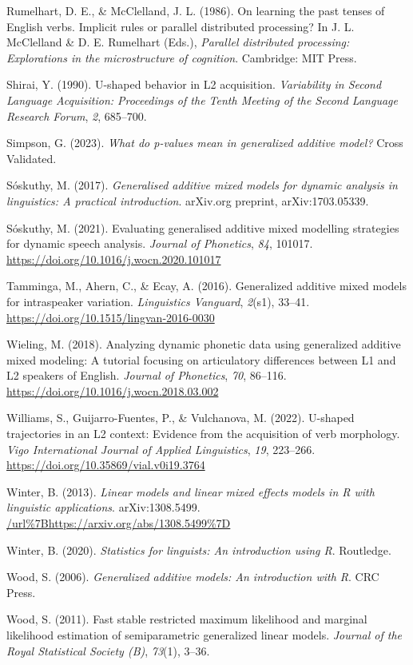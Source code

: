 \documentclass[
  letterpaper,
  DIV=11,
  numbers=noendperiod]{scrartcl}
\newlength{\cslhangindent}
\newenvironment{CSLReferences}[2] %
 {\begin{list}{}{%
  \setlength{\itemindent}{0pt}
  \setlength{\leftmargin}{0pt}
  \setlength{\parsep}{0pt}
  \ifodd #1
   \setlength{\leftmargin}{\cslhangindent}
   \setlength{\itemindent}{-1\cslhangindent}
  \fi
  \setlength{\itemsep}{#2\baselineskip}}}
 {\end{list}}
\begin{document}
\begin{CSLReferences}{1}{0}
Rumelhart, D. E., \& McClelland, J. L. (1986). On learning the past
tenses of {E}nglish verbs. Implicit rules or parallel distributed
processing? In J. L. McClelland \& D. E. Rumelhart (Eds.),
\emph{Parallel distributed processing: Explorations in the
microstructure of cognition}. Cambridge: MIT Press.

Shirai, Y. (1990). {U}-shaped behavior in {L2} acquisition.
\emph{Variability in Second Language Acquisition: Proceedings of the
Tenth Meeting of the {Second Language Research Forum}}, \emph{2},
685--700.

Simpson, G. (2023). \emph{What do p-values mean in generalized additive
model?} Cross Validated.

Sóskuthy, M. (2017). \emph{Generalised additive mixed models for dynamic
analysis in linguistics: A practical introduction}. {a}rXiv.org
preprint, arXiv:1703.05339.

Sóskuthy, M. (2021). Evaluating generalised additive mixed modelling
strategies for dynamic speech analysis. \emph{Journal of Phonetics},
\emph{84}, 101017. \url{https://doi.org/10.1016/j.wocn.2020.101017}

Tamminga, M., Ahern, C., \& Ecay, A. (2016). Generalized additive mixed
models for intraspeaker variation. \emph{Linguistics Vanguard},
\emph{2}(s1), 33--41. \url{https://doi.org/10.1515/lingvan-2016-0030}

Wieling, M. (2018). Analyzing dynamic phonetic data using generalized
additive mixed modeling: A tutorial focusing on articulatory differences
between {L}1 and {L}2 speakers of {E}nglish. \emph{Journal of
Phonetics}, \emph{70}, 86--116.
\url{https://doi.org/10.1016/j.wocn.2018.03.002}

Williams, S., Guijarro-Fuentes, P., \& Vulchanova, M. (2022). {U}-shaped
trajectories in an {L}2 context: Evidence from the acquisition of verb
morphology. \emph{Vigo International Journal of Applied Linguistics},
\emph{19}, 223--266. \url{https://doi.org/10.35869/vial.v0i19.3764}

Winter, B. (2013). \emph{Linear models and linear mixed effects models
in {R} with linguistic applications}. {a}rXiv:1308.5499.
\url{/url\%7Bhttps://arxiv.org/abs/1308.5499\%7D}

Winter, B. (2020). \emph{Statistics for linguists: An introduction using
{R}}. Routledge.

Wood, S. (2006). \emph{Generalized additive models: An introduction with
{R}}. CRC Press.

Wood, S. (2011). Fast stable restricted maximum likelihood and marginal
likelihood estimation of semiparametric generalized linear models.
\emph{Journal of the Royal Statistical Society (B)}, \emph{73}(1),
3--36.

\end{CSLReferences}
\end{document}
